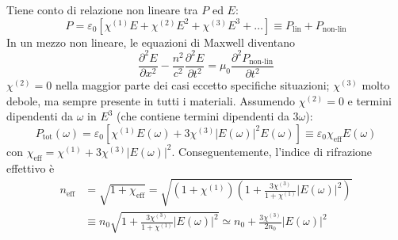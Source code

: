 \documentclass[10pt, a4paper]{scrartcl}
\numberwithin{equation}{subsection}
\theoremstyle{style1}
\begin{document}
Tiene conto di relazione non lineare tra $P$ ed $E$:
\begin{equation}
	P = \varepsilon _0 \left[ \chi ^{(1)} E + \chi ^{(2)} E^2 + \chi ^{(3)} E^3 + \ldots \right] \equiv P_\text{lin}+ P_\text{non-lin}
\end{equation}
In un mezzo non lineare, le equazioni di Maxwell diventano
\begin{equation}
	\frac{\partial ^2 E}{\partial x^2} - \frac{n^2}{c^2}\frac{\partial ^2E}{\partial t^2} = \mu_0 \frac{\partial ^2 P_\text{non-lin}}{\partial t^2} 
\end{equation}
$\chi ^{(2)} =0$ nella maggior parte dei casi eccetto specifiche situazioni; $\chi ^{(3)} $ molto debole, ma sempre presente in tutti i materiali. Assumendo $\chi ^{(2)} =0$ e termini dipendenti da $\omega$ in $E^{3 } $ (che contiene termini dipendenti da $3\omega$):
\begin{equation}
	P_\text{tot}(\omega) = \varepsilon _0 \left[ \chi ^{(1)} E(\omega) + 3\chi ^{(3)} \left\lvert E(\omega) \right\rvert ^2 E(\omega) \right] \equiv \varepsilon _0 \chi _\text{eff} E(\omega) 
\end{equation}
con $\chi _\text{eff}= \chi ^{(1)} + 3\chi ^{(3)} \left\lvert E(\omega) \right\rvert ^2$. Conseguentemente, l'indice di rifrazione effettivo \`e 
\begin{equation}
	\begin{split}
		n_\text{eff}&=\sqrt{1+\chi _\text{eff}} = \sqrt{\left(1+ \chi ^{(1)} \right) \left(1+ \frac{3\chi ^{(3)} }{1+ \chi ^{(1)} } \left\lvert E(\omega) \right\rvert ^2\right) } \\
			    &\equiv n_0 \sqrt{1+ \frac{3\chi ^{(3)} }{1+\chi ^{(1)} } \left\lvert E(\omega)  \right\rvert ^2}\simeq n_0 + \frac{3\chi ^{(3)} }{2n_0}\left\lvert E(\omega) \right\rvert ^2 
	\end{split}
\end{equation}
\end{document}

